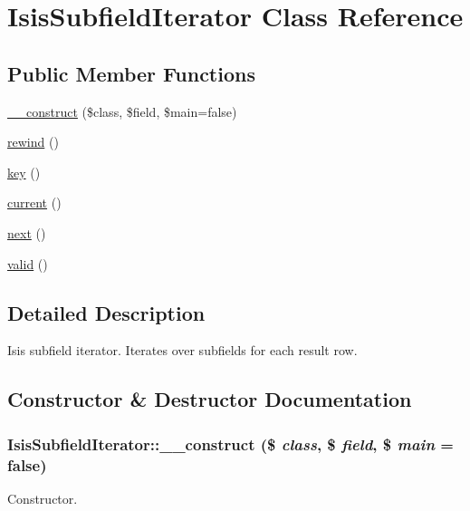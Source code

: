 \hypertarget{classIsisSubfieldIterator}{
\section{IsisSubfieldIterator Class Reference}
\label{classIsisSubfieldIterator}
}
\subsection*{Public Member Functions}
\begin{DoxyCompactItemize}
\item 
\hyperlink{classIsisSubfieldIterator_adc5472ca67d20defcab9eba45975dc29}{\_\-\_\-construct} (\$class, \$field, \$main=false)
\item 
\hyperlink{classIsisSubfieldIterator_a971b36317fab4fc07573f215a118fb40}{rewind} ()
\item 
\hyperlink{classIsisSubfieldIterator_a4ee62ad436a7c4ec1dac0c0c5d2a2c85}{key} ()
\item 
\hyperlink{classIsisSubfieldIterator_a7c31b7e8db31e1465d29fb58b2448bd8}{current} ()
\item 
\hyperlink{classIsisSubfieldIterator_a74363e3dbfbde6d409b8ba3b70fc9371}{next} ()
\item 
\hyperlink{classIsisSubfieldIterator_a1934438bfdfa1827e6bcc71d3c90f2db}{valid} ()
\end{DoxyCompactItemize}


\subsection{Detailed Description}
Isis subfield iterator. Iterates over subfields for each result row. 

\subsection{Constructor \& Destructor Documentation}
\hypertarget{classIsisSubfieldIterator_adc5472ca67d20defcab9eba45975dc29}{
\subsubsection[{\_\-\_\-construct}]{\setlength{\rightskip}{0pt plus 5cm}IsisSubfieldIterator::\_\-\_\-construct (\$ {\em class}, \/  \$ {\em field}, \/  \$ {\em main} = {\ttfamily false})}}
\label{classIsisSubfieldIterator_adc5472ca67d20defcab9eba45975dc29}
Constructor.


